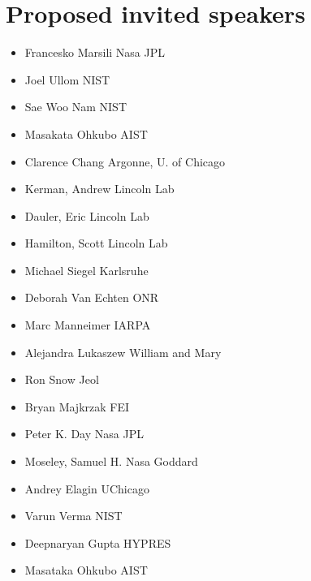\documentclass{article}
\begin{document}
\section{Proposed invited speakers}
\begin{itemize}
\item Francesko Marsili	Nasa JPL
\item Joel Ullom	NIST
\item Sae Woo Nam	NIST
\item Masakata Ohkubo	AIST
\item Clarence Chang 	Argonne, U. of Chicago
\item Kerman, Andrew 	Lincoln Lab
\item Dauler, Eric	Lincoln Lab
\item Hamilton, Scott	Lincoln Lab
\item Michael Siegel	Karlsruhe
\item Deborah Van Echten	ONR
\item Marc Manneimer	IARPA
\item Alejandra Lukaszew	William and Mary
\item Ron Snow	Jeol
\item Bryan Majkrzak	FEI
\item Peter K. Day	Nasa JPL
\item Moseley, Samuel H.	Nasa Goddard
\item Andrey Elagin	UChicago
\item Varun Verma	NIST
\item Deepnaryan Gupta HYPRES
\item Masataka Ohkubo AIST
\end{itemize}
\end{document}

